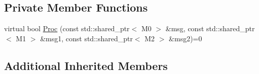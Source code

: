 \subsection*{Private Member Functions}
\begin{DoxyCompactItemize}
\item 
virtual bool \hyperlink{classapollo_1_1cyber_1_1Component_3_01M0_00_01M1_00_01M2_00_01NullType_01_4_adf9bb797c34d0eed163a7f95d1c6bcd7}{Proc} (const std\-::shared\-\_\-ptr$<$ M0 $>$ \&msg, const std\-::shared\-\_\-ptr$<$ M1 $>$ \&msg1, const std\-::shared\-\_\-ptr$<$ M2 $>$ \&msg2)=0
\end{DoxyCompactItemize}
\subsection*{Additional Inherited Members}


